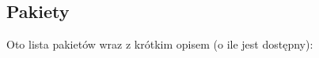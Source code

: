 \subsection{Pakiety}
Oto lista pakietów wraz z krótkim opisem (o ile jest dostępny)\+:\begin{DoxyCompactList}
\item{}
\end{DoxyCompactList}
